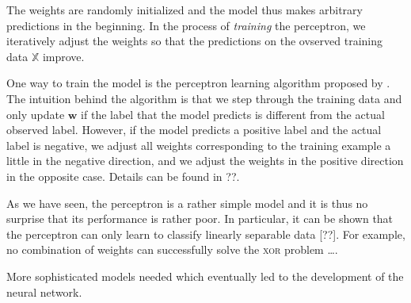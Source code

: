 The weights are randomly initialized and the model thus makes arbitrary predictions in the beginning. In the process of \emph{training} the perceptron, we iteratively adjust the weights so that the predictions on the ovserved training data $\mathbb{X}$ improve.

One way to train the model is the perceptron learning algorithm proposed by \cite{Rosenblatt1958386}. The intuition behind the algorithm is that we step through the training data and only update $\bm{w}$ if the label that the model predicts is different from the actual observed label. However, if the model predicts a positive label and the actual label is negative, we adjust all weights corresponding to the training example a little in the negative direction, and we adjust the weights in the positive direction in the opposite case. Details can be found in ??.

As we have seen, the perceptron is a rather simple model and it is thus no surprise that its performance is rather poor. In particular, it can be shown that the perceptron can only learn to classify linearly separable data [??]. For example, no combination of weights can successfully solve the \textsc{xor} problem \ldots.

More sophisticated models needed which eventually led to the development of the neural network.